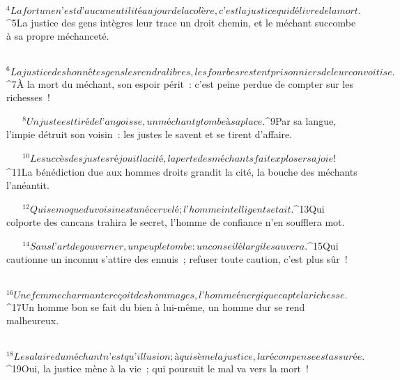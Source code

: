            
         
${}^{4}La fortune n’est d’aucune utilité au jour de la colère,
        c’est la justice qui délivre de la mort.
        
           
         
${}^{5}La justice des gens intègres leur trace un droit chemin,
        et le méchant succombe à sa propre méchanceté.
        
           
         
${}^{6}La justice des honnêtes gens les rendra libres,
        les fourbes restent prisonniers de leur convoitise.
        
           
         
${}^{7}À la mort du méchant, son espoir périt :
        c’est peine perdue de compter sur les richesses !
        
           
         
${}^{8}Un juste est tiré de l’angoisse,
        un méchant y tombe à sa place.
        
           
         
${}^{9}Par sa langue, l’impie détruit son voisin :
        les justes le savent et se tirent d’affaire.
        
           
         
${}^{10}Le succès des justes réjouit la cité,
        la perte des méchants fait exploser sa joie !
        
           
         
${}^{11}La bénédiction due aux hommes droits grandit la cité,
        la bouche des méchants l’anéantit.
        
           
         
${}^{12}Qui se moque du voisin est un écervelé ;
        l’homme intelligent se tait.
        
           
         
${}^{13}Qui colporte des cancans trahira le secret,
        l’homme de confiance n’en soufflera mot.
        
           
         
${}^{14}Sans l’art de gouverner, un peuple tombe :
        un conseil élargi le sauvera.
        
           
         
${}^{15}Qui cautionne un inconnu s’attire des ennuis ;
        refuser toute caution, c’est plus sûr !
        
           
         
${}^{16}Une femme charmante reçoit des hommages,
        l’homme énergique capte la richesse.
        
           
         
${}^{17}Un homme bon se fait du bien à lui-même,
        un homme dur se rend malheureux.
        
           
         
${}^{18}Le salaire du méchant n’est qu’illusion ;
        à qui sème la justice, la récompense est assurée.
        
           
         
${}^{19}Oui, la justice mène à la vie ;
        qui poursuit le mal va vers la mort !
        
